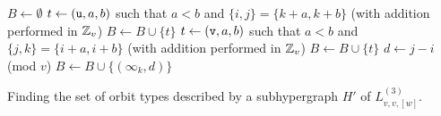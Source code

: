 \begin{algorithm}
$B \gets \emptyset$\;
 {
     {
        $t \gets ({\tt u}, a, b)$ such that $a < b$ and $\{i, j\} = \{k+a, k+b\}$ (with addition performed in $\mathbb{Z}_v$)\;
        $B \gets B \cup \{ t \}$ \;
    }  {
        $t \gets ({\tt v}, a, b)$ such that $a < b$ and $\{j, k\} = \{i+a, i+b\}$ (with addition performed in $\mathbb{Z}_v$)\;
        $B \gets B \cup \{ t \}$ \;
    }  {
        $d \gets j-i$ (mod $v$)\;
        $B \gets B \cup \{ (\infty_k, d) \}$ \;
    }
}
\;
\caption{Finding the set of orbit types described by a subhypergraph $H'$ of $L_{v,v,[w]}^{(3)}$.} \label{alg:candelabra-hypergraph-type}
\end{algorithm}